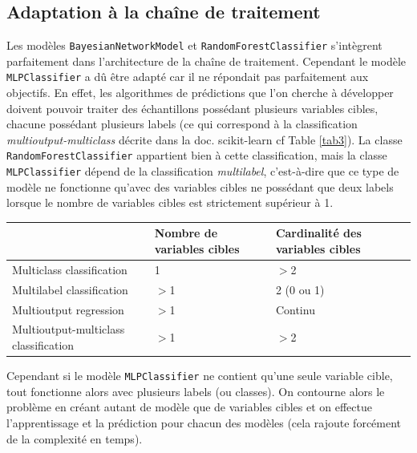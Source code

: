
\subsection{Adaptation à la chaîne de traitement}

Les modèles \texttt{BayesianNetworkModel} et \texttt{RandomForestClassifier} s’intègrent parfaitement dans l’architecture de la chaîne de traitement. Cependant le modèle \texttt{MLPClassifier} a dû être adapté car il ne répondait pas parfaitement aux objectifs. En effet, les algorithmes de prédictions que l’on cherche à développer doivent pouvoir traiter des échantillons possédant plusieurs variables cibles, chacune possédant plusieurs labels (ce qui correspond à la classification \textit{multioutput-multiclass} décrite dans la doc. scikit-learn cf Table \ref{tab3}). La classe \texttt{RandomForestClassifier} appartient bien à cette classification, mais la classe \texttt{MLPClassifier} dépend de la classification \textit{multilabel}, c’est-à-dire que ce type de modèle ne fonctionne qu’avec des variables cibles ne possédant que deux labels lorsque le nombre de variables cibles est strictement supérieur à 1.

\begin{center}
\begin{tabular}{lp{2.5cm}p{2.5cm}}
\rowcolor[RGB]{200, 200, 200} & Nombre de variables cibles & Cardinalité des variables cibles \\
\hline
Multiclass classification & 1 & $>$2 \\
Multilabel classification & $>$1 & 2 (0 ou 1) \\
Multioutput regression & $>$1 & Continu \\
Multioutput-multiclass classification & $>$1 & $>$2

\end{tabular}
\label{tab3}
\end{center}

Cependant si le modèle \texttt{MLPClassifier} ne contient qu’une seule variable cible, tout fonctionne alors avec plusieurs labels (ou classes). On contourne alors le problème en créant autant de modèle que de variables cibles et on effectue l’apprentissage et la prédiction pour chacun des modèles (cela rajoute forcément de la complexité en temps).


